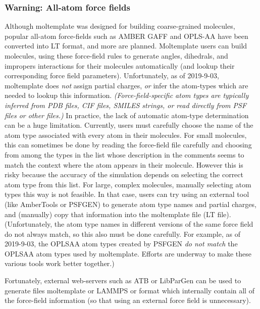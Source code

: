 \documentclass[11pt]{article}
\begin{document}
\subsubsection*{Warning: All-atom force fields}

Although moltemplate was designed for building coarse-grained molecules,
popular all-atom force-fields such as AMBER GAFF and OPLS-AA have been
converted into LT format, and more are planned.  Moltemplate
users can build molecules, using these force-field rules to generate
angles, dihedrals, and impropers interactions for their molecules automatically
(and lookup their corresponding force field parameters).
Unfortunately, as of 2019-9-03, moltemplate does 
\textit{not} assign partial charges, 
\textit{or} infer the atom-types which are needed to lookup this information.
\textit{(Force-field-specific atom types are typically inferred from PDB files,
CIF files, SMILES strings, or read directly from PSF files or other files.)}
In practice, the lack of automatic atom-type
determination can be a huge limitation.
Currently, users must carefully choose the name
of the atom type associated with every atom in their molecules.
For small molecules, this can sometimes be done by reading the force-field
file carefully and choosing from among the \@atom types in the list
whose description in the comments seems to match the context where
the atom appears in their molecule.  However this is risky because the accuracy
of the simulation depends on selecting the correct atom type from this list.
For large, complex molecules, manually selecting atom types this way
is not feasible.  In that case, users can try using an external tool
(like AmberTools or PSFGEN) to generate atom type names and partial charges,
and (manually) copy that information into the moltemplate file (LT file).
(Unfortunately, the atom type names in different versions of the
 same force field do not always match, so this also must be done carefully.
 For example, as of 2019-9-03, the OPLSAA atom types created by PSFGEN
 \textit{do not match} the OPLSAA atom types used by moltemplate.
 Efforts are underway to make these various tools work better together.)

Fortunately, external web-servers such as ATB or LibParGen can be
used to generate files moltemplate or LAMMPS or format which internally
contain all of the force-field information (so that using an external
force field is unnecessary).
\end{document}

